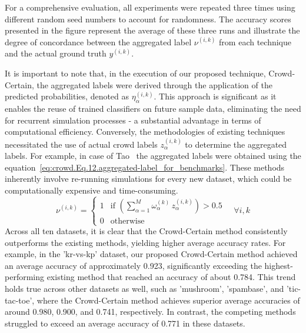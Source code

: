For a comprehensive evaluation, all experiments were repeated three times using different random seed numbers to account for randomness. The accuracy scores presented in the figure represent the average of these three runs and illustrate the degree of concordance between the aggregated label $\nu^{(i,k)}$ from each technique and the actual ground truth $y^{(i,k)}$.

It is important to note that, in the execution of our proposed technique, Crowd-Certain, the aggregated labels were derived through the application of the predicted probabilities, denoted as $\eta_{\alpha}^{(i,k)}$. This approach is significant as it enables the reuse of trained classifiers on future sample data, eliminating the need for recurrent simulation processes - a substantial advantage in terms of computational efficiency. Conversely, the methodologies of existing techniques necessitated the use of actual crowd labels $z_\alpha^{(i,k)}$ to determine the aggregated labels. For example, in case of Tao~\cite{tao_Label_2020} the aggregated labels were obtained using the equation~\ref{eq:crowd.Eq.12.aggregated-label_for_benchmarks}. These methods inherently involve re-running simulations for every new dataset, which could be computationally expensive and time-consuming.
%
\begin{equation}
    \nu^{(i,k)} =
    \begin{cases}
        1 & \text{if } \left(\sum_{\alpha=1}^{M} \omega_{\alpha}^{(k)}\, z_{\alpha}^{(i,k)}\right) > 0.5 \\
        0 & \text{otherwise}
    \end{cases}
    \quad \forall i, k
    \label{eq:crowd.Eq.12.aggregated-label_for_benchmarks}
\end{equation}
%
Across all ten datasets, it is clear that the Crowd-Certain method consistently outperforms the existing methods, yielding higher average accuracy rates. For example, in the 'kr-vs-kp' dataset, our proposed Crowd-Certain method achieved an average accuracy of approximately 0.923, significantly exceeding the highest-performing existing method that reached an accuracy of about 0.784. This trend holds true across other datasets as well, such as 'mushroom', 'spambase', and 'tic-tac-toe', where the Crowd-Certain method achieves superior average accuracies of around 0.980, 0.900, and 0.741, respectively. In contrast, the competing methods struggled to exceed an average accuracy of 0.771 in these datasets.
%
